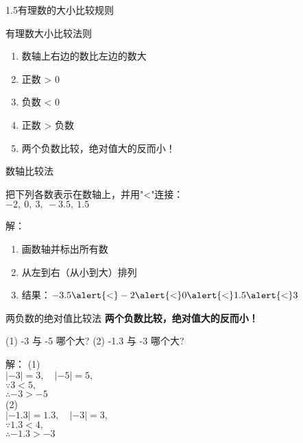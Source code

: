 \begin{frame}{1.5有理数的大小比较规则}
\begin{block}{有理数大小比较法则}
\begin{enumerate}[label={\arabic*.}]
  \item 数轴上右边的数比左边的数\alert{大}
  \item 正数 \alert{>} 0
  \item 负数 \alert{<} 0
  \item 正数 \alert{>} 负数
  \item 两个负数比较，绝对值大的反而\alert{小}！
\end{enumerate}
\end{block}

\end{frame}

\begin{frame}{数轴比较法}
\begin{example}
  把下列各数表示在数轴上，并用"<"连接：\\
  $-2,\ 0,\ 3,\ -3.5,\ 1.5$
\end{example}

\pause
\begin{block}{解：}
\begin{enumerate}[label={\arabic*.}]
  \item 画数轴并标出所有数
  \begin{figure}
  \end{figure}
  \item 从左到右（从小到大）排列
  \item 结果：$-3.5 \alert{<} -2 \alert{<}  0 \alert{<}  1.5 \alert{<}  3$
\end{enumerate}
\end{block}
\end{frame}

\begin{frame}{两负数的绝对值比较法}
\textbf{两个负数比较，绝对值大的反而\alert{小}！}
\begin{example}
(1) -3 与 -5 哪个大? (2) -1.3 与 -3 哪个大?\\
\end{example}
\pause
\begin{block}{解：}
(1) \\
$| -3 | = 3, \quad | -5 | = 5, $ \\
$\because 3 < 5, $ \\
$\therefore -3 > -5$ \\
(2) \\
$| -1.3 | = 1.3, \quad |-3| = 3, $ \\
$\because 1.3 < 4, $\\
$\therefore -1.3 > -3$
\end{block}
\end{frame}
